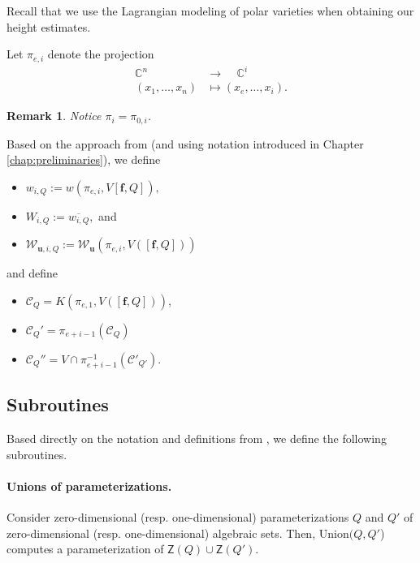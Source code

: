 \documentclass[12pt]{article}
\def\C{\mathbb{C}}
\newtheorem{remark}[theorem]{Remark}
\def\Zeroes{\mathsf{Z}}
\def\Union{{\sf Union}}
\def\C{\mathbb{C}}
\begin{document}
\noindent 
Recall that we use the Lagrangian modeling of polar varieties when obtaining our height estimates. 


%
Let $\pi_{e,i}$ denote the projection
\begin{align*}
\C^n~~~~~ &\rightarrow~~~~~ \C^i \\
(x_1,\hdots,x_n) &\mapsto  (x_e,\hdots,x_i).    
\end{align*} 

\begin{remark}
    Notice $\pi_i = \pi_{0,i}$. 
\end{remark}

Based on the approach from \cite{SchostMohabBabySteps2011} (and using notation introduced in Chapter \ref{chap:preliminaries}), we define 
\begin{itemize}
    \item $w_{i,Q} := w(\pi_{e,i},V[\bm f,Q]),$
    \item $W_{i,Q} := \overline{w_{i,Q}},$ and
    \item $\mathscr{W}_{\bm u,i,Q} := \mathscr{W}_{\bm u}(\pi_{e,i},V([\bm f,Q]))$
\end{itemize}



and define
%
\begin{itemize}
    \item $\mathscr{C}_Q = K(\pi_{e,1}, V([\bm f,Q]))$, 
    \item $\mathscr{C}_Q' = \pi_{e+i-1}(\mathscr{C}_Q)$
    \item $\mathscr{C}_Q'' = V \cap \pi_{e+i-1}^{-1}(\mathscr{C}'_{Q'})$.
\end{itemize}
%




\subsection{Subroutines}

Based directly on the notation and definitions from \cite{SchostMohabBabySteps2011}, we define the following subroutines. 

\paragraph*{Unions of parameterizations.}
Consider zero-dimensional (resp. one-dimensional) parameterizations $Q$ and $Q'$ of zero-dimensional (resp. one-dimensional) algebraic sets. Then, \Union$(Q,Q'$) computes a parameterization of $\Zeroes(Q)\cup \Zeroes(Q')$.  
\end{document}
